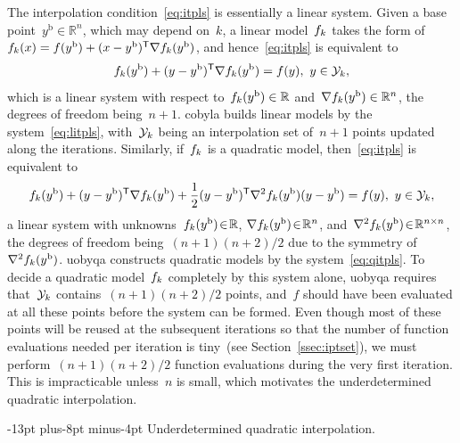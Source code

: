 \documentclass[smallextended]{svjour3}
\makeatletter
\newcommand{\R}{\mathbb{R}}
\newcommand{\T}{\mathsf{T}}
\newcommand{\base}{{\text{b}}}
\newcommand{\objm}[1][k]{\obj\ifthenelse{\equal{#1}{}}{}{_{#1}}}
\newcommand{\obj}{f}
\newcommand{\xpt}[1][k]{\mathcal{Y}\ifthenelse{\equal{#1}{}}{}{_{#1}}}
\def\paragraph{\@startsection{paragraph}{4}{\z@}%
    {-13pt plus-8pt minus-4pt}{\z@}
    {\normalsize\bfseries}}
\makeatother
\begin{document}
The interpolation condition~\eqref{eq:itpls} is essentially a linear system.
Given a base point~$y^{\base}\in \R^n$, which may depend on~$k$, a linear model~$\objm$ takes the form of~$\objm(x) = \obj(y^{\base}) + (x - y^{\base})^{\T} \nabla \objm(y^{\base})$, and hence~\eqref{eq:itpls} is equivalent to
\begin{equation}
    \label{eq:litpls}
    \objm(y^{\base}) + (y -y^{\base})^{\T} \nabla \objm(y^{\base}) = \obj(y), ~ y \in \xpt,
\end{equation}
which is a linear system with respect to~$\objm(y^\base) \in \R$ and~$\nabla \objm(y^\base) \in \R^n$, the degrees of freedom being~$n + 1$.
\Gls{cobyla} builds linear models by the system~\eqref{eq:litpls}, with~$\xpt$ being an interpolation set of~$n+1$ points updated along the iterations.
Similarly, if~$\objm$ is a quadratic model, then~\eqref{eq:itpls} is equivalent to
\begin{equation}
    \label{eq:qitpls}
    \objm(y^{\base}) + (y -y^{\base})^{\T} \nabla \objm(y^{\base}) + \frac{1}{2}(y-y^{\base})^{\T} \nabla^2 \objm(y^{\base}) (y-y^{\base}) = \obj(y), ~ y \in \xpt,
\end{equation}
a linear system with unknowns~$\objm(y^\base) \! \in \! \R$, $\nabla \objm(y^\base) \! \in \! \R^n$, and~$\nabla^2 \objm(y^{\base}) \! \in \! \R^{n \times n}$, the degrees of freedom being~$(n + 1)(n + 2) / 2$ due to the symmetry of~$\nabla^2 \objm(y^\base)$.
\Gls{uobyqa} constructs quadratic models by the system~\eqref{eq:qitpls}.
To decide a quadratic model~$\objm$ completely by this system alone, \gls{uobyqa} requires that~$\xpt$ contains~$(n+1)(n+2)/2$ points, and~$f$ should have been evaluated at all these points before the system can be formed.
Even though most of these points will be reused at the subsequent iterations so that the number of function evaluations needed per iteration is tiny~(see Section~\ref{ssec:iptset}), we must perform~$(n + 1)(n + 2) / 2$ function evaluations during the very first iteration.
This is impracticable unless~$n$ is small, which motivates the underdetermined quadratic interpolation.

\paragraph{Underdetermined quadratic interpolation.}
\end{document}
